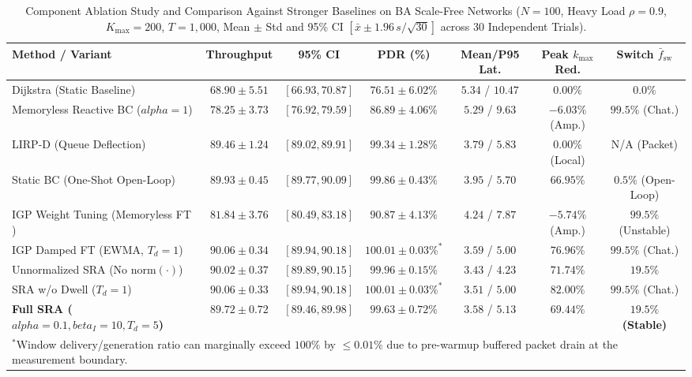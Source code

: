 \documentclass{ccjnl}
\newcommand{\rev}[1]{{\color{blue}#1}}
\def\rev#1{#1}%
\def\kappa{k}%
\def\alpha{alpha}%
\def\beta{beta}%
\begin{document}
{\begin{table}[t]
\centering
\scriptsize\setlength{\tabcolsep}{2.2pt}\renewcommand{\arraystretch}{1.05}
\caption{\rev{Component Ablation Study and Comparison Against Stronger Baselines on BA Scale-Free Networks ($N=100$, Heavy Load $\rho=0.9$, $K_{\max}=200$, $T=1{,}000$, Mean $\pm$ Std and 95\% CI $[\bar{x} \pm 1.96\,s/\sqrt{30}]$ across 30 Independent Trials).}}
\label{tab:ablation_results}
\begin{tabular*}{\textwidth}{@{\extracolsep{\fill}}lcccccc@{}}
\toprule
\textbf{Method / Variant} & \textbf{Throughput} & \textbf{95\% CI} & \textbf{PDR (\%)} & \textbf{Mean/P95 Lat.} & \textbf{Peak $\kappa_{\max}$ Red.} & \textbf{Switch $\bar{f}_{\text{sw}}$} \\
\midrule
Dijkstra (Static Baseline) & $68.90 \pm 5.51$ & $[66.93, 70.87]$ & $76.51 \pm 6.02\%$ & $5.34$ / $10.47$ & $0.00\%$ & $0.0\%$ \\
Memoryless Reactive BC ($\alpha=1$) & $78.25 \pm 3.73$ & $[76.92, 79.59]$ & $86.89 \pm 4.06\%$ & $5.29$ / $9.63$ & $-6.03\%$ (Amp.) & $99.5\%$ (Chat.) \\
LIRP-D (Queue Deflection) & $89.46 \pm 1.24$ & $[89.02, 89.91]$ & $99.34 \pm 1.28\%$ & $3.79$ / $5.83$ & $0.00\%$ (Local) & N/A (Packet) \\
Static BC (One-Shot Open-Loop) & $89.93 \pm 0.45$ & $[89.77, 90.09]$ & $99.86 \pm 0.43\%$ & $3.95$ / $5.70$ & $66.95\%$ & $0.5\%$ (Open-Loop) \\
IGP Weight Tuning (Memoryless FT \cite{Fortz2000OSPF}) & $81.84 \pm 3.76$ & $[80.49, 83.18]$ & $90.87 \pm 4.13\%$ & $4.24$ / $7.87$ & $-5.74\%$ (Amp.) & $99.5\%$ (Unstable) \\
IGP Damped FT (EWMA, $T_d=1$) & $90.06 \pm 0.34$ & $[89.94, 90.18]$ & $100.01 \pm 0.03\%^*$ & $3.59$ / $5.00$ & $76.96\%$ & $99.5\%$ (Chat.) \\
Unnormalized SRA (No $\mathrm{norm}(\cdot)$) & $90.02 \pm 0.37$ & $[89.89, 90.15]$ & $99.96 \pm 0.15\%$ & $3.43$ / $4.23$ & $71.74\%$ & $19.5\%$ \\
SRA w/o Dwell ($T_d=1$) & $90.06 \pm 0.33$ & $[89.94, 90.18]$ & $100.01 \pm 0.03\%^*$ & $3.51$ / $5.00$ & $82.00\%$ & $99.5\%$ (Chat.) \\
\midrule
\textbf{Full SRA ($\alpha=0.1, \beta_I=10, T_d=5$)} & $\mathbf{89.72 \pm 0.72}$ & $\mathbf{[89.46, 89.98]}$ & $\mathbf{99.63 \pm 0.72\%}$ & $\mathbf{3.58}$ / $\mathbf{5.13}$ & $\mathbf{69.44\%}$ & $\mathbf{19.5\%}$ \textbf{(Stable)} \\
\bottomrule
\multicolumn{7}{l}{\scriptsize\rev{$^*$Window delivery/generation ratio can marginally exceed $100\%$ by $\le 0.01\%$ due to pre-warmup buffered packet drain at the measurement boundary.}}
\end{tabular*}
\end{table}

}
\end{document}
